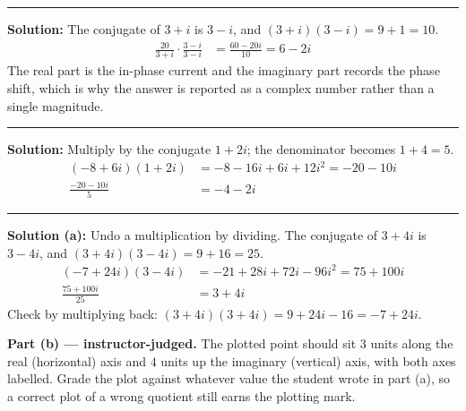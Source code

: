 \documentclass[12pt]{article}
\begin{document}
\vspace{0.15cm}
\noindent\rule{\linewidth}{0.2pt}


\textbf{Solution:} The conjugate of $3 + i$ is $3 - i$, and
$(3 + i)(3 - i) = 9 + 1 = 10$.
\begin{align*}
  \frac{20}{3 + i} \cdot \frac{3 - i}{3 - i}
    &= \frac{60 - 20i}{10} = 6 - 2i
\end{align*}
The real part is the in-phase current and the imaginary part records the phase
shift, which is why the answer is reported as a complex number rather than a
single magnitude. 

\vspace{0.15cm}
\noindent\rule{\linewidth}{0.2pt}


\textbf{Solution:} Multiply by the conjugate $1 + 2i$; the denominator becomes
$1 + 4 = 5$.
\begin{align*}
  (-8 + 6i)(1 + 2i) &= -8 - 16i + 6i + 12i^2 = -20 - 10i \\
  \frac{-20 - 10i}{5} &= -4 - 2i
\end{align*}

\vspace{0.15cm}
\noindent\rule{\linewidth}{0.2pt}


\textbf{Solution (a):} Undo a multiplication by dividing. The conjugate of
$3 + 4i$ is $3 - 4i$, and $(3 + 4i)(3 - 4i) = 9 + 16 = 25$.
\begin{align*}
  (-7 + 24i)(3 - 4i) &= -21 + 28i + 72i - 96i^2 = 75 + 100i \\
  \frac{75 + 100i}{25} &= 3 + 4i
\end{align*}
Check by multiplying back: $(3 + 4i)(3 + 4i) = 9 + 24i - 16 = -7 + 24i$. 

\textbf{Part (b) --- instructor-judged.} The plotted point should sit $3$ units
along the real (horizontal) axis and $4$ units up the imaginary (vertical) axis,
with both axes labelled. Grade the plot against whatever value the student wrote
in part (a), so a correct plot of a wrong quotient still earns the plotting mark.
\end{document}

